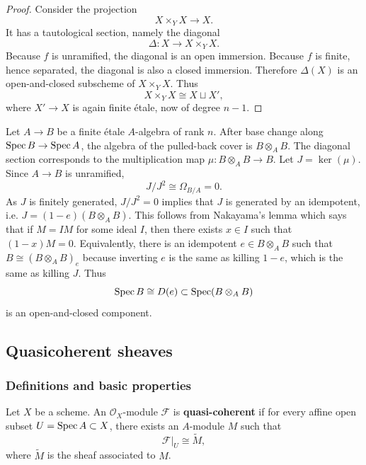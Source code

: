 \documentclass[12pt]{article}
\begin{document}
\begin{proof}
    Consider the projection
    \[
        X\times_Y X\to X.
    \]
    It has a tautological section, namely the diagonal
    \[
        \Delta:X\to X\times_Y X.
    \]
    Because \(f\) is unramified, the diagonal is an open immersion. Because \(f\) is finite, hence separated, the diagonal is also a closed immersion. Therefore \(\Delta(X)\) is an open-and-closed subscheme of \(X\times_Y X\). Thus
    \[
        X\times_Y X\cong X\sqcup X',
    \]
    where \(X'\to X\) is again finite étale, now of degree \(n-1\).
\end{proof}

\begin{remark}
    Let \(A\to B\) be a finite étale \(A\)-algebra of rank \(n\). After base change along \(\operatorname{Spec} B\to \operatorname{Spec} A\), the algebra of the pulled-back cover is $B\otimes_A B$.
    The diagonal section corresponds to the multiplication map $\mu:B\otimes_A B\to B$. Let $J=\ker(\mu)$. Since \(A\to B\) is unramified,
    \[
        J/J^2\cong \Omega_{B/A}=0.
    \]
    As \(J\) is finitely generated, \(J/J^2=0\) implies that \(J\) is generated by an idempotent, i.e. $J = (1-e)(B \otimes_A B)$. This follows from Nakayama's lemma which says that if $M = IM$ for some ideal $I$, then there exists $x \in I$ such that $(1-x)M=0$. Equivalently, there is an idempotent \(e\in B\otimes_A B\) such that $B\cong (B\otimes_A B)_e$ because inverting $e$ is the same as killing $1-e$, which is the same as killing $J$.
    Thus
    \[
        \operatorname{Spec} B\cong D(e)\subset \operatorname{Spec}(B\otimes_A B)
    \]
    is an open-and-closed component.
\end{remark}
\subsection{Quasicoherent sheaves}

\subsubsection{Definitions and basic properties}

\begin{definition}
    Let $X$ be a scheme. An $\mathcal O_X$-module $\mathcal F$ is \textbf{quasi-coherent} if for every affine open subset $U=\operatorname{Spec} A \subset X$, there exists an $A$-module $M$ such that
    \[
        \mathcal F|_U \cong \widetilde{M},
    \]
    where $\widetilde{M}$ is the sheaf associated to $M$.
\end{definition}
\end{document}
